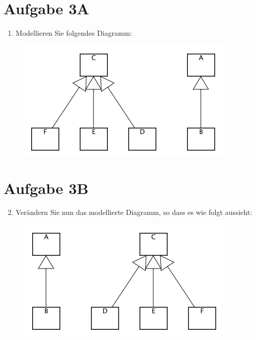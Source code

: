 \documentclass[12pt]{article}
\begin{document}
\section*{Aufgabe 3A}

\begin{enumerate}
    \item Modellieren Sie folgendes Diagramm:
\end{enumerate}

\begin{figure}[h]
    \includegraphics[scale=0.9]{resources/exercise-3a}
\end{figure}

\newpage

\section*{Aufgabe 3B}

\begin{enumerate}
    \setcounter{enumi}{1}
    \item Verändern Sie nun das modellierte Diagramm, so dass es wie folgt aussieht:
\end{enumerate}

\begin{figure}[h]
    \includegraphics[scale=0.9]{resources/exercise-3b}
\end{figure}

\newpage
\end{document}

